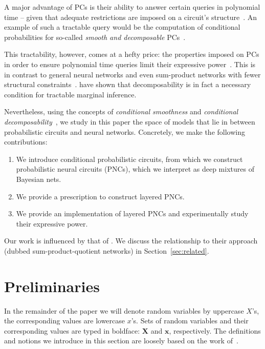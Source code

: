 \documentclass[letterpaper]{article} %
\newcommand{\Xvars}{\ensuremath{\mathbf{X}}}
\newcommand{\xvars}{\ensuremath{\mathbf{x}}}
\newcommand{\Xvar}{\ensuremath{X}}
\newcommand{\xvar}{\ensuremath{x}}
\begin{document}
A major advantage of PCs is their ability to answer certain queries in polynomial time -- given that adequate restrictions are imposed on a circuit's structure~\citep{vergari2021compositional}. An example of such a tractable query would be the computation of conditional probabilities for so-called \textit{smooth and decomposable} PCs~\citep{darwiche2001decomposable,darwiche2003differential}.

This tractability, however, comes at a hefty price: the properties imposed on PCs in order to ensure polynomial time queries limit their expressive power~\citep{martens2014expressive,sharir2018sum,zhang2021probabilistic}.
This is in contrast to general neural networks and even sum-product networks with fewer structural constraints~\citep{delalleau2011shallow,kileel2019expressive}. \citet{martens2014expressive} have shown that decomposability is in fact a necessary condition for tractable marginal inference.

Nevertheless, using the concepts of \textit{conditional smoothness} and \textit{conditional decomposability}~\citep{sharir2018sum}, we study in this paper the space of models that lie in between probabilistic circuits and neural networks.
Concretely, we make the following contributions:
\begin{enumerate}
    \item We introduce conditional probabilistic circuits, from which we construct  probabilistic neural circuits (PNCs), which we interpret as deep mixtures of Bayesian nets.
    \item  We provide a prescription to construct layered PNCs.
    \item We provide an implementation of layered PNCs and experimentally study their expressive power.
\end{enumerate}

Our work is influenced by that of \citet{sharir2018sum}. We discuss the relationship to their approach (dubbed sum-product-quotient networks) in Section~\ref{sec:related}.




\section{Preliminaries}
\label{sec:prelim}

In the remainder of the paper we will denote random variables by uppercase $\Xvar$'s, the corresponding values are lowercase $\xvar$'s. Sets of random variables and their corresponding values are typed in boldface: $\Xvars$ and $\xvars$, respectively.
The definitions and notions we introduce in this section are loosely based on the work of~\citet{vergari2021compositional}.
\end{document}
